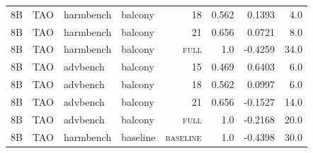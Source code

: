\begin{tabular}{llllrrrr}
8B & TAO & harmbench & balcony & 18 & 0.562 & 0.1393 & 4.0 \\
8B & TAO & harmbench & balcony & 21 & 0.656 & 0.0721 & 8.0 \\
8B & TAO & harmbench & balcony & \textsc{full} & 1.0 & -0.4259 & 34.0 \\
8B & TAO & advbench & balcony & 15 & 0.469 & 0.6403 & 6.0 \\
8B & TAO & advbench & balcony & 18 & 0.562 & 0.0997 & 6.0 \\
8B & TAO & advbench & balcony & 21 & 0.656 & -0.1527 & 14.0 \\
8B & TAO & advbench & balcony & \textsc{full} & 1.0 & -0.2168 & 20.0 \\
8B & TAO & harmbench & baseline & \textsc{baseline} & 1.0 & -0.4398 & 30.0 \\
\bottomrule
\end{tabular}
